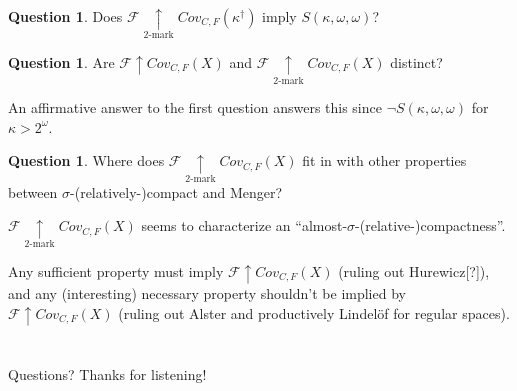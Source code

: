 \documentclass{beamer}
\theoremstyle{definition}
\newtheorem{question}[theorem]{Question}
\newcommand{\win}{\uparrow}
\newcommand{\kmarkwin}[1]{\underset{#1\text{-mark}}{\uparrow}}
\newcommand{\oneptlind}[1]{#1^\dagger}
\newcommand{\mengame}[1]{Cov_{C,F}(#1)}
\newcommand{\<}{\langle}
\renewcommand{\>}{\rangle}
\newcommand{\alcompS}[1]{S(#1,\omega,\omega)}
\newcommand{\pl}[1]{\mathscr{#1}}
\begin{document}
\begin{frame}
  \begin{question}
    Does $\pl F\kmarkwin2\mengame{\oneptlind\kappa}$ imply $\alcompS\kappa$?
  \end{question}

  \pause

  \begin{question}
    Are $\pl F\win\mengame X$ and $\pl F\kmarkwin2\mengame X$ distinct?
  \end{question}

  An affirmative answer to the first question answers this since
  $\neg\alcompS\kappa$ for $\kappa>2^\omega$.
\end{frame}
\begin{frame}
  \begin{question}
    Where does $\pl F\kmarkwin2\mengame X$ fit in with other properties
    between $\sigma$-(relatively-)compact and Menger?
  \end{question}
  $\pl F\kmarkwin2\mengame X$ seems to characterize an
  ``almost-$\sigma$-(relative-)compactness''.

  Any sufficient property must imply $\pl F\win\mengame X$ (ruling out
  Hurewicz[?]), and any (interesting) necessary property shouldn't be implied by
  $\pl F\win\mengame X$ (ruling out Alster and productively Lindel\"of for
  regular spaces).
\end{frame}

\section*{}

\begin{frame}
Questions? Thanks for listening!
\end{frame}
\end{document}
